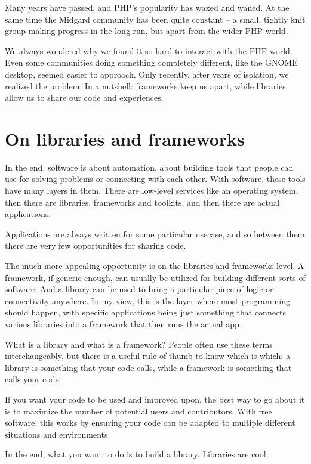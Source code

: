 Many years have passed, and PHP’s popularity has waxed and waned. At the same
time the Midgard community has been quite constant -- a small, tightly knit
group making progress in the long run, but apart from the wider PHP
world.

We always wondered why we found it so hard to interact with the PHP world. Even
some communities doing something completely different, like the GNOME desktop,
seemed easier to approach. Only recently, after years of isolation, we realized
the problem. In a nutshell: frameworks keep us apart, while libraries allow us to
share our code and experiences.

\section*{On libraries and frameworks}

In the end, software is about automation, about building tools that people can
use for solving problems or connecting with each other. With software, these
tools have many layers in them. There are low-level services like an operating
system, then there are libraries, frameworks and toolkits, and then there are
actual applications.

Applications are always written for some particular usecase, and so between
them there are very few opportunities for sharing code.

The much more appealing opportunity is on the libraries and frameworks level. A
framework, if generic enough, can usually be utilized for building different
sorts of software. And a library can be used to bring a particular piece of
logic or connectivity anywhere. In my view, this is the layer where most
programming should happen, with specific applications being just something that
connects various libraries into a framework that then runs the actual app.

What is a library and what is a framework? People often use these terms
interchangeably, but there is a useful rule of thumb to know which is which: a
library is something that your code calls, while a framework is something that
calls your code.

If you want your code to be used and improved upon, the best way to go about it
is to maximize the number of potential users and contributors. With free
software, this works by ensuring your code can be adapted to multiple different
situations and environments.

In the end, what you want to do is to build a library. Libraries are cool.

